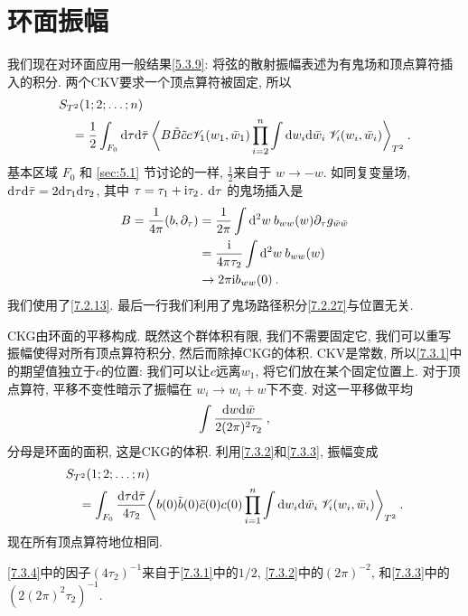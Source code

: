 \section{环面振幅} \label{sec:7.3}%
我们现在对环面应用一般结果\eqref{5.3.9}: 将弦的散射振幅表述为有鬼场和顶点算符插入的积分. 两个CKV要求一个顶点算符被固定, 所以
\begin{align}
	&S_{T^{2}}(1 ; 2 ; \ldots ; n)  \nonumber \\
	&\quad=\frac{1}{2} \int_{F_{0}} \mathrm{d} \tau \mathrm{d} \bar{\tau} \:
	\biggl\langle B \tilde{B} \tilde{c} c \mathscr{V}_{1}(w_{1}, \bar{w}_{1}) 
	\prod_{i=2}^{n} \int \mathrm{d} w_{i} \mathrm{d} \bar{w}_{i} \: \mathscr{V}_{i}(w_{i}, \bar{w}_{i})\biggr\rangle_{T^{2}} \:. \label{7.3.1}
\end{align}
基本区域 $F_{0}$ 和 \ref{sec:5.1} 节讨论的一样,  $\frac{1}{2}$来自于 $w \rightarrow-w$. 
如同复变量场, $\mathrm{d} \tau \mathrm{d} \bar{\tau}=2 \mathrm{d} \tau_{1} \mathrm{d} \tau_{2}$, 其中 $\tau=\tau_{1}+\mathrm{i} \tau_{2}$. 
$\mathrm{d} \tau$ 的鬼场插入是
\begin{align}
	B=\frac{1}{4 \pi}(b, \partial_{\tau}) &=\frac{1}{2 \pi} \int \mathrm{d}^{2} w \: b_{w w}(w) \partial_{\tau} g_{\bar{w} \bar{w}} \nonumber \\
	&=\frac{\mathrm{i}}{4 \pi \tau_{2}} \int \mathrm{d}^{2} w \: b_{w w}(w) \nonumber \\
	& \rightarrow 2 \pi \mathrm{i} b_{w w}(0) \:.  \label{7.3.2}
\end{align}
我们使用了\eqref{7.2.13}. 最后一行我们利用了鬼场路径积分\eqref{7.2.27}与位置无关. 

CKG由环面的平移构成. 既然这个群体积有限, 我们不需要固定它, 我们可以重写振幅使得对所有顶点算符积分, 然后而除掉CKG的体积. 
CKV是常数, 所以\eqref{7.3.1}中的期望值独立于$c$的位置: 我们可以让$c$远离$w_{1}$, 将它们放在某个固定位置上. 
对于顶点算符, 平移不变性暗示了振幅在 $w_{i} \rightarrow w_{i}+w$下不变. 对这一平移做平均
\begin{equation}
	\int \frac{\mathrm{d} w \mathrm{d} \bar{w}}{2(2 \pi)^{2} \tau_{2}} \:, \label{7.3.3}
\end{equation}
分母是环面的面积, 这是CKG的体积. 利用\eqref{7.3.2}和\eqref{7.3.3}, 振幅变成
\begin{align}
	&S_{T^{2}}(1 ; 2 ; \ldots ; n) \nonumber \\
	&\quad=\int_{F_{0}} \frac{\mathrm{d} \tau \mathrm{d} \bar{\tau}}{4 \tau_{2}} 
	\biggl\langle b(0) \tilde{b}(0) \tilde{c}(0) c(0) \prod_{i=1}^{n} \int \mathrm{d} w_{i} \mathrm{d} \bar{w}_{i}\: 
	\mathscr{V}_{i}(w_{i}, \bar{w}_{i})\biggr\rangle_{T^{2}} \:. \label{7.3.4}
\end{align}
现在所有顶点算符地位相同.
\begin{tcolorbox}
	\begin{remark}
		\eqref{7.3.4}中的因子$(4\tau_{2})^{-1}$来自于\eqref{7.3.1}中的$1/2$, \eqref{7.3.2}中的$(2\pi)^{-2}$, 和\eqref{7.3.3}中的$(2(2\pi )^2 \tau _2 )^{-1}$.
	\end{remark}
\end{tcolorbox}

